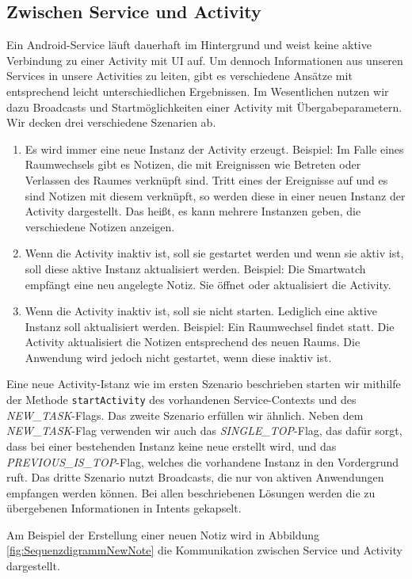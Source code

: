 \subsection{Zwischen Service und Activity}
Ein Android-Service läuft dauerhaft im Hintergrund und weist keine aktive Verbindung zu einer Activity mit UI auf. Um dennoch Informationen aus unseren Services in unsere Activities zu leiten, gibt es verschiedene Ansätze mit entsprechend leicht unterschiedlichen Ergebnissen. 
Im Wesentlichen nutzen wir dazu Broadcasts und Startmöglichkeiten einer Activity mit Übergabeparametern. 
Wir decken drei verschiedene Szenarien ab.
\begin{enumerate}
\item{Es wird immer eine neue Instanz der Activity erzeugt. Beispiel: Im Falle eines Raumwechsels gibt es Notizen, die mit Ereignissen wie Betreten oder Verlassen des Raumes verknüpft sind. Tritt eines der Ereignisse auf und es sind Notizen mit diesem verknüpft, so werden diese in einer neuen Instanz der Activity dargestellt. Das heißt, es kann mehrere Instanzen geben, die verschiedene Notizen anzeigen.}
\item{Wenn die Activity inaktiv ist, soll sie gestartet werden und wenn sie aktiv ist, soll diese aktive Instanz aktualisiert werden. Beispiel: Die Smartwatch empfängt eine neu angelegte Notiz. Sie öffnet oder aktualisiert die Activity.}
\item{Wenn die Activity inaktiv ist, soll sie nicht starten. Lediglich eine aktive Instanz soll aktualisiert werden. Beispiel: Ein Raumwechsel findet statt. Die Activity aktualisiert die Notizen entsprechend des neuen Raums. Die Anwendung wird jedoch nicht gestartet, wenn diese inaktiv ist.}
\end{enumerate}

Eine neue Activity-Istanz wie im ersten Szenario beschrieben starten wir mithilfe der Methode \texttt{startActivity} des vorhandenen Service-Contexts und des \textit{NEW\_TASK}-Flags. Das zweite Szenario erfüllen wir ähnlich. Neben dem \textit{NEW\_TASK}-Flag verwenden wir auch das \textit{SINGLE\_TOP}-Flag, das dafür sorgt, dass bei einer bestehenden Instanz keine neue erstellt wird, und das \textit{PREVIOUS\_IS\_TOP}-Flag, welches die vorhandene Instanz in den Vordergrund ruft. Das dritte Szenario nutzt Broadcasts, die nur von aktiven Anwendungen empfangen werden können. Bei allen beschriebenen Lösungen werden die zu übergebenen Informationen in Intents gekapselt.

Am Beispiel der Erstellung einer neuen Notiz wird in Abbildung \ref{fig:SequenzdigrammNewNote} die Kommunikation zwischen Service und Activity dargestellt.

